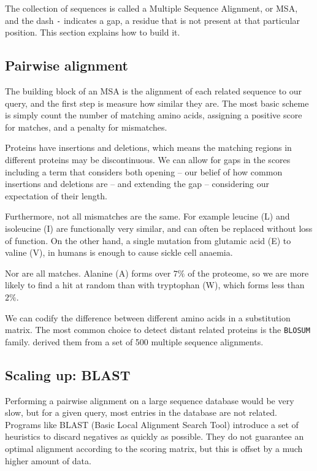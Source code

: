 The collection of sequences is called a Multiple Sequence Alignment, or MSA, and the dash \texttt{-} indicates a gap, a residue that is not present at that particular position.
This section explains how to build it.


\subsection{Pairwise alignment}
The building block of an MSA is the alignment of each related sequence to our query, and the first step is measure how similar they are.
The most basic scheme is simply count the number of matching amino acids, assigning a positive score for matches, and a penalty for mismatches.

Proteins  have insertions and deletions, which means the matching regions in different proteins may be discontinuous.
We can allow for gaps in the scores including a term that considers both opening -- our belief of how common insertions and deletions are -- and extending the gap -- considering our expectation of their length.

Furthermore, not all mismatches are the same.
For example leucine (L) and isoleucine (I) are functionally very similar, and can often be replaced without loss of function.
On the other hand, a single mutation from glutamic acid (E) to valine (V), in humans is enough to cause sickle cell anaemia.

Nor are all matches.
Alanine (A) forms over $7\%$ of the proteome, so we are more likely to find a hit at random than with tryptophan (W), which forms less than $2\%$.

We can codify  the difference between different amino acids in a substitution matrix.
The most common choice to detect distant related proteins is the \texttt{BLOSUM} family.
\citet{blosum} derived them from a set of 500 multiple sequence alignments.

\subsection{Scaling up: BLAST}
Performing a pairwise alignment on a large sequence database would be very slow, but for a given query, most entries in the database are not related.
Programs like BLAST (Basic Local Alignment Search Tool) introduce a set of heuristics to discard negatives as quickly as possible.
They do not guarantee an optimal alignment according to the scoring matrix, but this is offset by a much higher amount of data.

